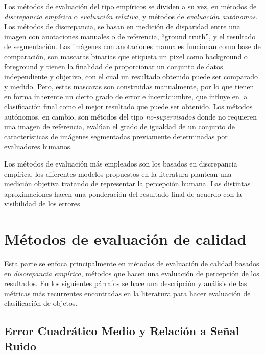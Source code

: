Los métodos de evaluación del tipo empíricos se dividen a su vez, en métodos de \emph{discrepancia empírica} o \emph{evaluación relativa}, y métodos de \emph{evaluación autónomos}. Los métodos de discrepancia, se basan en medición de disparidad entre una imagen con anotaciones manuales o de referencia, ``ground truth'', y el resultado de segmentación. Las imágenes con anotaciones manuales funcionan como base de comparación, son mascaras binarias que etiqueta un pixel como background o foreground y tienen la finalidad de proporcionar un conjunto de datos independiente y objetivo, con el cual un resultado obtenido puede ser comparado y medido. Pero, estas mascaras son construidas manualmente, por lo que tienen en forma inherente un cierto grado de error e incertidumbre, que influye en la clasificación final como el mejor resultado que puede ser obtenido. Los métodos autónomos, en cambio, son métodos del tipo \emph{no-supervisados} \cite{zhang_image_2008} donde no requieren una imagen de referencia, evalúan el grado de igualdad de un conjunto de características de imágenes segmentadas previamente determinadas por evaluadores humanos.

Los métodos de evaluación más empleados son los basados en discrepancia empírica, los diferentes modelos propuestos en la literatura plantean una medición objetiva tratando de representar la percepción humana. Las distintas aproximaciones hacen una ponderación del resultado final de acuerdo con la visibilidad de los errores.



\section{Métodos de evaluación de calidad}

Esta parte se enfoca principalmente en métodos de evaluación de calidad basados en \emph{discrepancia empírica}, métodos que hacen una evaluación de percepción de los resultados. En los siguientes párrafos se hace una descripción y análisis de las métricas más recurrentes encontradas en la literatura para hacer evaluación de clasificación de objetos. 

\subsection{Error Cuadrático Medio y Relación a Señal Ruido}

